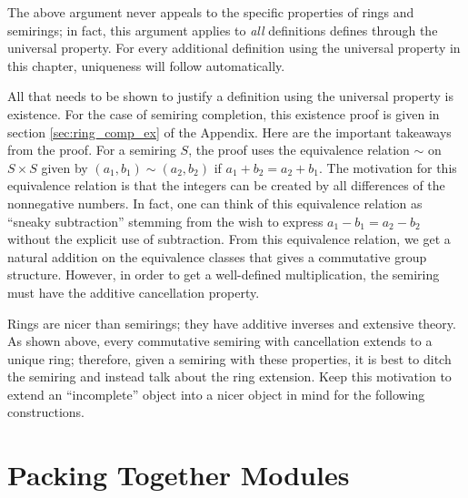 \documentclass[../sean_thesis.tex]{subfiles}
\begin{document}
The above argument never appeals to the specific properties of rings and semirings; in fact, this argument applies to \emph{all} definitions defines through the universal property. For every additional definition using the universal property in this chapter, uniqueness will follow automatically. 

All that needs to be shown to justify a definition using the universal property is existence. For the case of semiring completion, this existence proof is given in section \ref{sec:ring_comp_ex} of the Appendix. Here are the important takeaways from the proof. For a semiring $S$, the proof uses the equivalence relation $\sim$ on $S \times S$ given by $(a_1,b_1) \sim (a_2,b_2)$ if $a_1 + b_2 = a_2 + b_1$. The motivation for this equivalence relation is that the integers can be created by all differences of the nonnegative numbers. In fact, one can think of this equivalence relation as ``sneaky subtraction'' stemming from the wish to express $a_1 - b_1 = a_2 - b_2$ without the explicit use of subtraction. From this equivalence relation, we get a natural addition on the equivalence classes that gives a commutative group structure. However, in order to get a well-defined multiplication, the semiring must have the additive cancellation property.

Rings are nicer than semirings; they have additive inverses and extensive theory. As shown above, every commutative semiring with cancellation extends to a unique ring; therefore, given a semiring with these properties, it is best to ditch the semiring and instead talk about the ring extension. Keep this motivation to extend an ``incomplete'' object into a nicer object in mind for the following constructions.

\section{Packing Together Modules}


\end{document}
